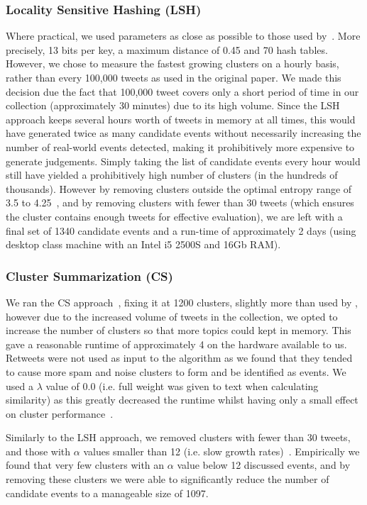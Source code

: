 \subsubsection{Locality Sensitive Hashing (LSH)}
Where practical, we used parameters as close as possible to those used by~\cite{Petrovic:2010:SFS:1857999.1858020}.
More precisely, 13 bits per key, a maximum distance of 0.45 and 70 hash tables.
However, we chose to measure the fastest growing clusters on a hourly basis, rather than every 100,000 tweets as used in the original paper.
We made this decision due the fact that 100,000 tweet covers only a short period of time in our collection (approximately 30 minutes) due to its high volume.
Since the LSH approach keeps several hours worth of tweets in memory at all times, this would have generated twice as many candidate events without necessarily increasing the number of real-world events detected, making it prohibitively more expensive to generate judgements.
Simply taking the list of candidate events every hour would still have yielded a prohibitively high number of clusters (in the hundreds of thousands).
However by removing clusters outside the optimal entropy range of 3.5 to 4.25~\citep{Petrovic:2010:SFS:1857999.1858020}, and by removing clusters with fewer than 30 tweets (which ensures the cluster contains enough tweets for effective evaluation), we are left with a final set of 1340 candidate events and a run-time of approximately 2 days (using desktop class machine with an Intel i5 2500S and 16Gb RAM).

\subsubsection{Cluster Summarization (CS)}
We ran the CS approach~\citep{Aggarwal12}, fixing it at 1200 clusters, slightly more than used by \cite{Aggarwal12}, however due to the increased volume of tweets in the collection, we opted to increase the number of clusters so that more topics could kept in memory.
This gave a reasonable runtime of approximately 4 on the hardware available to us.
Retweets were not used as input to the algorithm as we found that they tended to cause more spam and noise clusters to form and be identified as events.
We used a \(\lambda\) value of 0.0 (i.e. full weight was given to text when calculating similarity) as this greatly decreased the runtime whilst having only a small effect on cluster performance~\citep{Aggarwal12}.

Similarly to the LSH approach, we removed clusters with fewer than 30 tweets, and those with \(\alpha\) values smaller than 12  (i.e. slow growth rates)~\citep{Aggarwal12}.
Empirically we found that very few clusters with an \(\alpha\) value below 12 discussed events, and by removing these clusters we were able to significantly reduce the number of candidate events to a manageable size of 1097.

